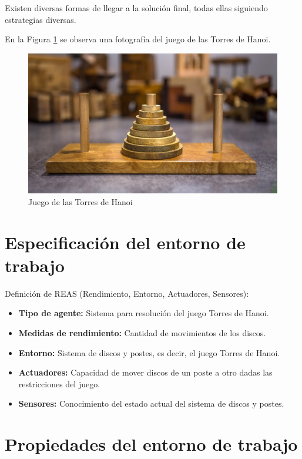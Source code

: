 \documentclass[onecolumn]{IEEEtran}
\begin{document}
Existen diversas formas de llegar a la solución final, todas ellas siguiendo estrategias diversas.

En la Figura \ref{fig:towers-of-hanoi} se observa una fotografía del juego de las Torres de Hanoi.

\begin{figure}[ht]
    \centering
    \includegraphics[width=0.5\linewidth]{tower-of-hanoi.jpg}
    \caption{Juego de las Torres de Hanoi}
    \label{fig:towers-of-hanoi}
\end{figure}

\section{Especificación del entorno de trabajo}

Definición de REAS (Rendimiento, Entorno, Actuadores, Sensores):
\begin{itemize}
    \item \textbf{Tipo de agente:} Sistema para resolución del juego Torres de Hanoi.
    \item \textbf{Medidas de rendimiento:} Cantidad de movimientos de los discos.
    \item \textbf{Entorno:} Sistema de discos y postes, es decir, el juego Torres de Hanoi.
    \item \textbf{Actuadores:} Capacidad de mover discos de un poste a otro dadas las restricciones del juego.
    \item \textbf{Sensores:} Conocimiento del estado actual del sistema de discos y postes.
\end{itemize}

\section{Propiedades del entorno de trabajo}
\end{document}
